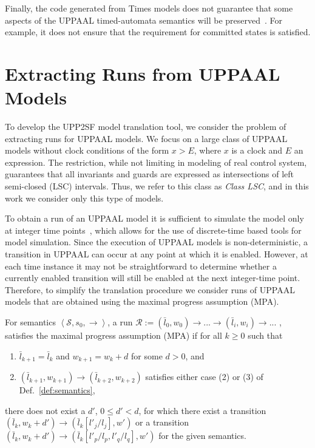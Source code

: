 Finally, the code generated from Times models does not guarantee that some aspects of the UPPAAL timed-automata semantics will be preserved~\cite{anaheed}. For example, it does not ensure that the requirement for committed states is satisfied. 


\section{Extracting Runs from UPPAAL Models}
\label{sec:runs}


To develop the UPP2SF model translation tool, we consider the problem of extracting runs for UPPAAL models. We focus on a large class of UPPAAL models without clock conditions of the form $x>E$, where $x$ is a clock and $E$ an expression. The restriction, while not limiting in modeling of real control system, guarantees that all invariants and guards are expressed as intersections of left semi-closed (LSC) intervals. Thus, we refer to this class as \textit{Class LSC}, and in this work we consider only this type of models. 

To obtain a run of an UPPAAL model it is sufficient to simulate the model only at integer time points~\cite{PMupp2sf_rtas12}, which allows for the use of discrete-time based tools for model simulation. Since the execution of UPPAAL models is non-deterministic, a transition in UPPAAL can occur at any point at which it is enabled. However, at each time instance it may not be straightforward to determine whether a currently enabled transition will still be enabled at the next integer-time point. 
Therefore, to simplify the translation procedure we consider runs of UPPAAL models that are obtained using the maximal progress assumption (MPA). 


\begin{definition}
For semantics $\left<\mathcal{S},s_0,\rightarrow\right>$, a run 
$\mathcal{R}:=(\bar{l}_0,w_0)\rightarrow...\rightarrow(\bar{l}_i,w_i)\rightarrow...$ , 
satisfies the maximal progress assumption (MPA) if for all $k\geq 0$ such that
\begin{enumerate}
\item $\bar{l}_{k+1}=\bar{l}_{k}$ and $w_{k+1}=w_k+d$ for some $d>0$, and
\item $(\bar{l}_{k+1},w_{k+1}) \rightarrow (\bar{l}_{k+2},w_{k+2})$ satisfies either case (2) or (3) of Def.~\ref{def:semantics},
\end{enumerate}
there does not exist a $d'$, $0\leq d'<d$, for which there exist a transition
$(\bar{l}_k,w_k+d') \rightarrow (\bar{l}_k[l'_j/l_j],w')$ or a transition $(\bar{l}_{k},w_{k}+d') \rightarrow (\bar{l}_k[l'_p/l_p,l'_q/l_q],w')$ for the given semantics.
\end{definition}

